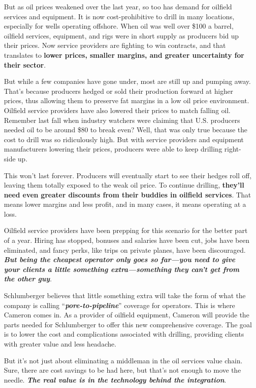 \documentclass[12pt,a4paper]{article}
\begin{document}
But as oil prices weakened over the last year, so too has demand for
oilfield services and equipment. It is now cost-prohibitive to drill in many
locations, especially for wells operating offshore. When oil was well over
\$100 a barrel, oilfield services, equipment, and rigs were in short supply
as producers bid up their prices. Now service providers are fighting to win
contracts, and that translates to \textbf{lower prices, smaller margins, and
  greater uncertainty for their sector}.

But while a few companies have gone under, most are still up and pumping
away. That's because producers hedged or sold their production forward at
higher prices, thus allowing them to preserve fat margins in a low oil price
environment. Oilfield service providers have also lowered their prices to
match falling oil. Remember last fall when industry watchers were claiming
that U.S. producers needed oil to be around \$80 to break even? Well, that
was only true because the cost to drill was so ridiculously high. But with
service providers and equipment manufacturers lowering their prices,
producers were able to keep drilling right-side up.

This won't last forever. Producers will eventually start to see their hedges
roll off, leaving them totally exposed to the weak oil price. To continue
drilling, \textbf{they'll need even greater discounts from their buddies in
  oilfield services}. That means lower margins and less profit, and in many
cases, it means operating at a loss.

Oilfield service providers have been prepping for this scenario for the
better part of a year. Hiring has stopped, bonuses and salaries have been
cut, jobs have been eliminated, and fancy perks, like trips on private
planes, have been discouraged. \textbf{\emph{But being the cheapest operator
    only goes so far---you need to give your clients a little something
    extra---something they can't get from the other guy}}.

Schlumberger believes that little something extra will take the form of what
the company is calling ``\textbf{\emph{pore-to-pipeline}}'' coverage for
operators. This is where Cameron comes in. As a provider of oilfield
equipment, Cameron will provide the parts needed for Schlumberger to offer
this new comprehensive coverage. The goal is to lower the cost and
complications associated with drilling, providing clients with greater value
and less headache.

But it's not just about eliminating a middleman in the oil services value
chain. Sure, there are cost savings to be had here, but that's not enough to
move the needle. \textbf{\emph{The real value is in the technology behind
    the integration}}.
\end{document}
